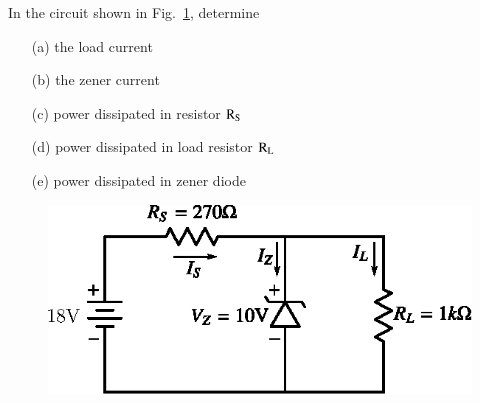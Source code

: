 \begin{problem}\label{prob1.29}
In the circuit shown in Fig.~\ref{fig1.48}, determine
\begin{itemize}
\item[(a)] the load current

\item[(b)] the zener current

\item[(c)] power dissipated in resistor $\textrm{R}_{\textrm{S}}$

\item[(d)] power dissipated in load resistor $\textrm{R}_{\textrm{L}}$

\item[(e)] power dissipated in zener diode
\end{itemize}
\begin{figure}[H]
\centering
\includegraphics{chap1/fig1.48.eps}
\caption{}\label{fig1.48}
\end{figure}
\end{problem}


